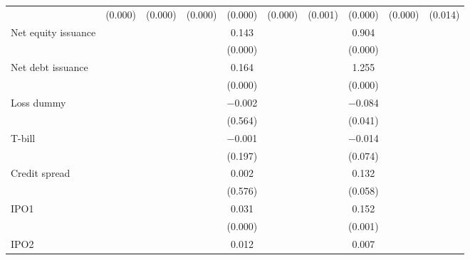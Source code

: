 \begin{longtable}{l*{9}{c}}
                    &     (0.000)&     (0.000)&     (0.000)&     (0.000)&     (0.000)&     (0.001)&     (0.000)&     (0.000)&     (0.014)\\
\addlinespace
Net equity issuance &            &            &            &       0.143&            &            &       0.904&            &            \\
                    &            &            &            &     (0.000)&            &            &     (0.000)&            &            \\
\addlinespace
Net debt issuance   &            &            &            &       0.164&            &            &       1.255&            &            \\
                    &            &            &            &     (0.000)&            &            &     (0.000)&            &            \\
\addlinespace
Loss dummy          &            &            &            &    $-$0.002&            &            &    $-$0.084&            &            \\
                    &            &            &            &     (0.564)&            &            &     (0.041)&            &            \\
\addlinespace
T-bill              &            &            &            &    $-$0.001&            &            &    $-$0.014&            &            \\
                    &            &            &            &     (0.197)&            &            &     (0.074)&            &            \\
\addlinespace
Credit spread       &            &            &            &       0.002&            &            &       0.132&            &            \\
                    &            &            &            &     (0.576)&            &            &     (0.058)&            &            \\
\addlinespace
IPO1                &            &            &            &       0.031&            &            &       0.152&            &            \\
                    &            &            &            &     (0.000)&            &            &     (0.001)&            &            \\
\addlinespace
IPO2                &            &            &            &       0.012&            &            &       0.007&            &            \\

\end{longtable}
